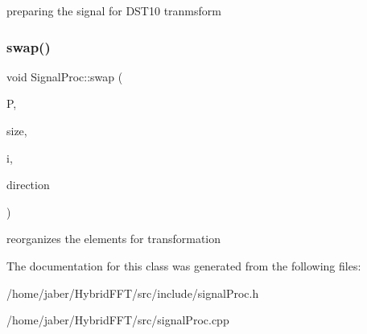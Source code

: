 preparing the signal for D\+S\+T10 tranmsform \mbox{\label{classSignalProc_a9bae65ace51f0ea5cf62283a20dc9a27}} 
\subsubsection{\texorpdfstring{swap()}{swap()}}
{\footnotesize\ttfamily void Signal\+Proc\+::swap (\begin{DoxyParamCaption}\item[{\mbox{\hyperlink{classChunkedArray}{Chunked\+Array}} \&}]{P,  }\item[{const int}]{size,  }\item[{const int}]{i,  }\item[{const int}]{direction }\end{DoxyParamCaption})}

reorganizes the elements for transformation 

The documentation for this class was generated from the following files\+:\begin{DoxyCompactItemize}
\item 
/home/jaber/\+Hybrid\+F\+F\+T/src/include/signal\+Proc.\+h\item 
/home/jaber/\+Hybrid\+F\+F\+T/src/signal\+Proc.\+cpp\end{DoxyCompactItemize}

